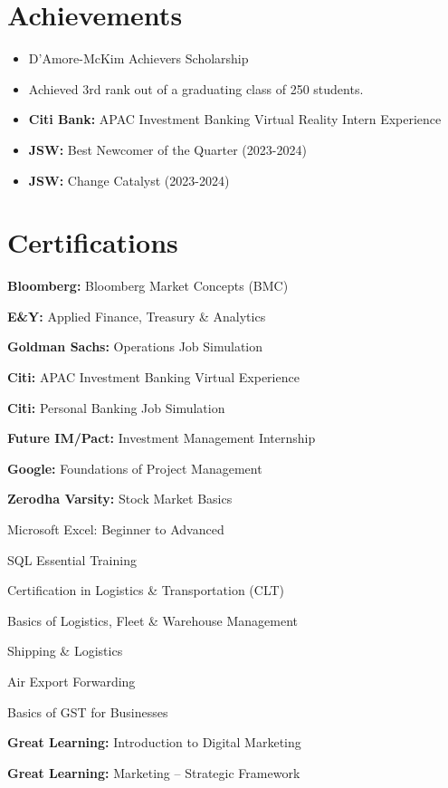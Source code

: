 \documentclass[letterpaper,11pt]{article}
\newcommand{\resumeItem}[1]{
  \item\small{
    {#1 \vspace{-2pt}}
  }
}
\newcommand{\resumeItemListStart}{\begin{itemize}}
\newcommand{\resumeItemListEnd}{\end{itemize}\vspace{-5pt}}
\begin{document}
\section{Achievements}
 \begin{itemize}[leftmargin=0.15in, label={}]
    \small{\item{
     \resumeItemListStart
             \resumeItem{D'Amore-McKim Achievers Scholarship}
            \resumeItem{Achieved 3rd rank out of a graduating class of 250 students.}
            \resumeItem{\textbf{Citi Bank:} APAC Investment Banking Virtual Reality Intern Experience}
            \resumeItem{\textbf{JSW:} Best Newcomer of the Quarter (2023-2024)}
            \resumeItem{\textbf{JSW:} Change Catalyst (2023-2024)}
             \resumeItemListEnd
             }}
 \end{itemize}

\section{Certifications}
\begin{itemize}[leftmargin=0.15in, label={}, itemsep=2pt]
  \begin{minipage}[t]{0.48\textwidth}
    \item \small \textbf{Bloomberg:} Bloomberg Market Concepts (BMC)
    \item \small \textbf{E\&Y:} Applied Finance, Treasury \& Analytics
    \item \small \textbf{Goldman Sachs:} Operations Job Simulation
    \item \small \textbf{Citi:} APAC Investment Banking Virtual Experience
    \item \small \textbf{Citi:} Personal Banking Job Simulation
    \item \small \textbf{Future IM/Pact:} Investment Management Internship
    \item \small \textbf{Google:} Foundations of Project Management
    \item \small \textbf{Zerodha Varsity:} Stock Market Basics
    \item \small Microsoft Excel: Beginner to Advanced
  \end{minipage}
  \hfill
  \begin{minipage}[t]{0.48\textwidth}
    \item \small SQL Essential Training
    \item \small Certification in Logistics \& Transportation (CLT)
    \item \small Basics of Logistics, Fleet \& Warehouse Management
    \item \small Shipping \& Logistics
    \item \small Air Export Forwarding
    \item \small Basics of GST for Businesses
    \item \small \textbf{Great Learning:} Introduction to Digital Marketing
    \item \small \textbf{Great Learning:} Marketing -- Strategic Framework
  \end{minipage}
\end{itemize}
\end{document}
